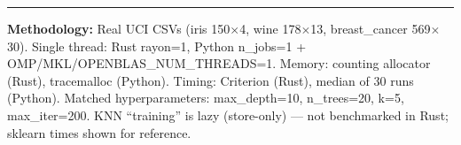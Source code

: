 \documentclass[11pt,a4paper]{article}
\begin{document}
\vspace{6pt}
\noindent\rule{\textwidth}{0.4pt}
{\footnotesize\color{neutralgray}
\textbf{Methodology:}
Real UCI CSVs (iris 150$\times$4, wine 178$\times$13, breast\_cancer 569$\times$30).
Single thread: Rust rayon=1, Python n\_jobs=1 + OMP/MKL/OPENBLAS\_NUM\_THREADS=1.
Memory: counting allocator (Rust), tracemalloc (Python).
Timing: Criterion (Rust), median of 30 runs (Python).
Matched hyperparameters: max\_depth=10, n\_trees=20, k=5, max\_iter=200.
KNN ``training'' is lazy (store-only) --- not benchmarked in Rust; sklearn times shown for reference.
}
\end{document}
